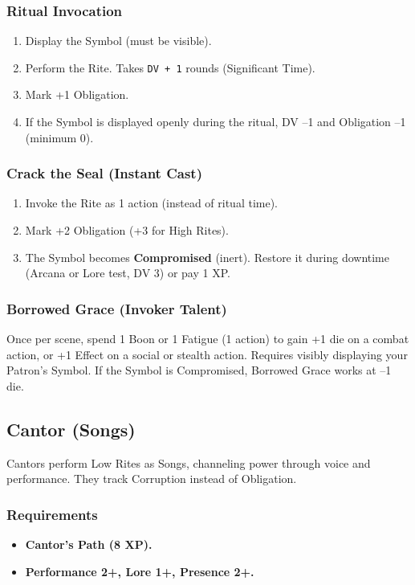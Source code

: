 \subsubsection{Ritual Invocation}
\begin{enumerate}
  \item Display the Symbol (must be visible).
  \item Perform the Rite. Takes \texttt{DV + 1} rounds (Significant Time).
  \item Mark +1 Obligation.
  \item If the Symbol is displayed openly during the ritual, DV –1 and Obligation –1 (minimum 0).
\end{enumerate}

\subsubsection{Crack the Seal (Instant Cast)}
\begin{enumerate}
  \item Invoke the Rite as 1 action (instead of ritual time).
  \item Mark +2 Obligation (+3 for High Rites).
  \item The Symbol becomes \textbf{Compromised} (inert). Restore it during downtime (Arcana or Lore test, DV 3) or pay 1 XP.
\end{enumerate}

\subsubsection{Borrowed Grace (Invoker Talent)}
Once per scene, spend 1 Boon or 1 Fatigue (1 action) to gain +1 die on a combat action, or +1 Effect on a social or stealth action. Requires visibly displaying your Patron's Symbol. If the Symbol is Compromised, Borrowed Grace works at –1 die.

\subsection{Cantor (Songs)}

Cantors perform Low Rites as Songs, channeling power through voice and performance. They track Corruption instead of Obligation.

\subsubsection{Requirements}
\begin{itemize}
  \item \textbf{Cantor's Path (8 XP).}
  \item \textbf{Performance 2+, Lore 1+, Presence 2+.}
\end{itemize}


